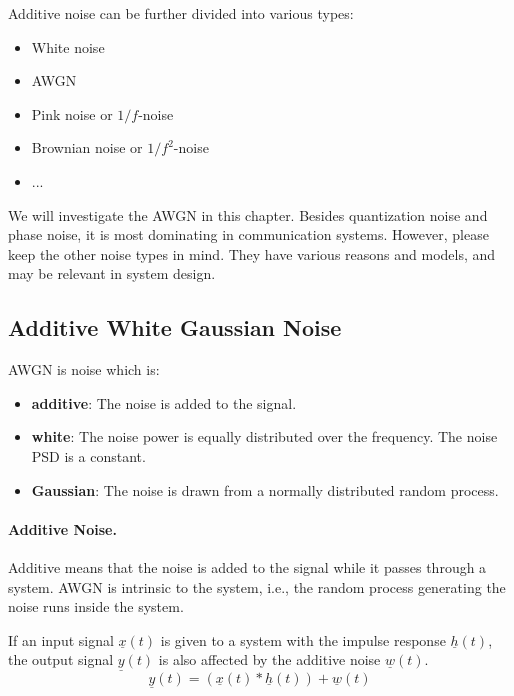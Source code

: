 \begin{refsection}
Additive noise can be further divided into various types:
\begin{itemize}
	\item White noise
	\item \ac{AWGN}
	\item Pink noise or $1/f$-noise
	\item Brownian noise or $1/f^2$-noise
	\item ...
\end{itemize}

We will investigate the \ac{AWGN} in this chapter. Besides quantization noise and phase noise, it is most dominating in communication systems. However, please keep the other noise types in mind. They have various reasons and models, and may be relevant in system design.

\subsection{Additive White Gaussian Noise}

 \ac{AWGN} is noise which is:
\begin{itemize}
	\item \textbf{additive}: The noise is added to the signal.
	\item \textbf{white}: The noise power is equally distributed over the frequency. The noise \ac{PSD} is a constant.
	\item \textbf{Gaussian}: The noise is drawn from a normally distributed random process.
\end{itemize}

\paragraph{Additive Noise.}

 Additive means that the noise is added to the signal while it passes through a system. \ac{AWGN} is intrinsic to the system, i.e., the random process generating the noise runs inside the system.

If an input signal $\underline{x}(t)$ is given to a system with the impulse response $\underline{h}(t)$, the output signal $\underline{y}(t)$ is also affected by the additive noise $\underline{w}(t)$.
\begin{equation}
	\underline{y}(t) = \left(\underline{x}(t) * \underline{h}(t)\right) + \underline{w}(t)
\end{equation}%


\end{refsection}
